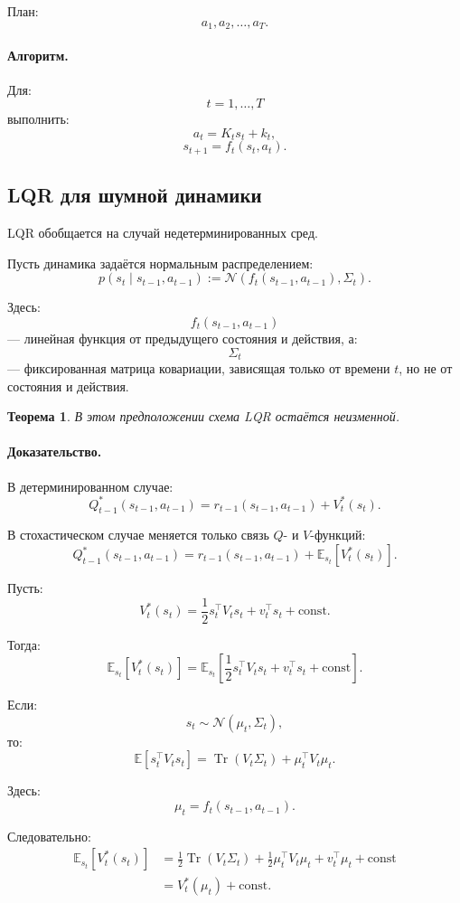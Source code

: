 \documentclass[12pt,a4paper]{article}
\newtheorem{theorem}{Теорема}
\begin{document}
План:
\[
a_1,a_2,\ldots,a_T.
\]

\paragraph{Алгоритм.}

Для:
\[
t=1,\ldots,T
\]
выполнить:
\[
a_t
=
K_ts_t+k_t,
\]
\[
s_{t+1}
=
f_t(s_t,a_t).
\]

\subsection{LQR для шумной динамики}

LQR обобщается на случай недетерминированных сред.

Пусть динамика задаётся нормальным распределением:
\[
p(s_t\mid s_{t-1},a_{t-1})
:=
\mathcal N
\left(
f_t(s_{t-1},a_{t-1}),
\Sigma_t
\right).
\]

Здесь:
\[
f_t(s_{t-1},a_{t-1})
\]
--- линейная функция от предыдущего состояния и действия, а:
\[
\Sigma_t
\]
--- фиксированная матрица ковариации, зависящая только от времени $t$, но не от состояния и действия.

\begin{theorem}
В этом предположении схема LQR остаётся неизменной.
\end{theorem}

\paragraph{Доказательство.}

В детерминированном случае:
\[
Q_{t-1}^\ast(s_{t-1},a_{t-1})
=
r_{t-1}(s_{t-1},a_{t-1})
+
V_t^\ast(s_t).
\]

В стохастическом случае меняется только связь $Q$- и $V$-функций:
\[
Q_{t-1}^\ast(s_{t-1},a_{t-1})
=
r_{t-1}(s_{t-1},a_{t-1})
+
\mathbb E_{s_t}
\left[
V_t^\ast(s_t)
\right].
\]

Пусть:
\[
V_t^\ast(s_t)
=
\frac{1}{2}s_t^\top V_ts_t
+
v_t^\top s_t
+
\text{const}.
\]

Тогда:
\[
\mathbb E_{s_t}
\left[
V_t^\ast(s_t)
\right]
=
\mathbb E_{s_t}
\left[
\frac{1}{2}s_t^\top V_ts_t
+
v_t^\top s_t
+
\text{const}
\right].
\]

Если:
\[
s_t\sim\mathcal N(\mu_t,\Sigma_t),
\]
то:
\[
\mathbb E
\left[
s_t^\top V_ts_t
\right]
=
\operatorname{Tr}(V_t\Sigma_t)
+
\mu_t^\top V_t\mu_t.
\]

Здесь:
\[
\mu_t
=
f_t(s_{t-1},a_{t-1}).
\]

Следовательно:
\[
\begin{aligned}
\mathbb E_{s_t}
\left[
V_t^\ast(s_t)
\right]
&=
\frac{1}{2}
\operatorname{Tr}(V_t\Sigma_t)
+
\frac{1}{2}
\mu_t^\top V_t\mu_t
+
v_t^\top \mu_t
+
\text{const}
\\
&=
V_t^\ast(\mu_t)
+
\text{const}.
\end{aligned}
\]
\end{document}
